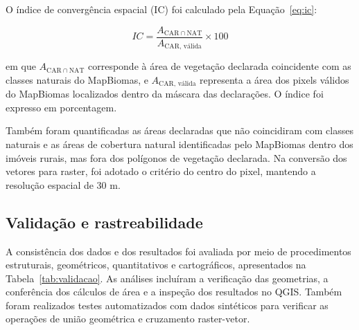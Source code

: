 O índice de convergência espacial (IC) foi calculado pela Equação~\ref{eq:ic}:

\begin{equation}
IC = \frac{A_{\mathrm{CAR} \cap \mathrm{NAT}}}{A_{\text{CAR, válida}}} \times 100
\label{eq:ic}
\end{equation}

\noindent em que $A_{\mathrm{CAR} \cap \mathrm{NAT}}$ corresponde à área de vegetação declarada coincidente com as classes naturais do MapBiomas, e $A_{\text{CAR, válida}}$ representa a área dos pixels válidos do MapBiomas localizados dentro da máscara das declarações. O índice foi expresso em porcentagem.

Também foram quantificadas as áreas declaradas que não coincidiram com classes naturais e as áreas de cobertura natural identificadas pelo MapBiomas dentro dos imóveis rurais, mas fora dos polígonos de vegetação declarada. Na conversão dos vetores para raster, foi adotado o critério do centro do pixel, mantendo a resolução espacial de 30 m.

\subsection{Validação e rastreabilidade}

A consistência dos dados e dos resultados foi avaliada por meio de procedimentos estruturais, geométricos, quantitativos e cartográficos, apresentados na Tabela~\ref{tab:validacao}. As análises incluíram a verificação das geometrias, a conferência dos cálculos de área e a inspeção dos resultados no QGIS. Também foram realizados testes automatizados com dados sintéticos para verificar as operações de união geométrica e cruzamento raster-vetor.


